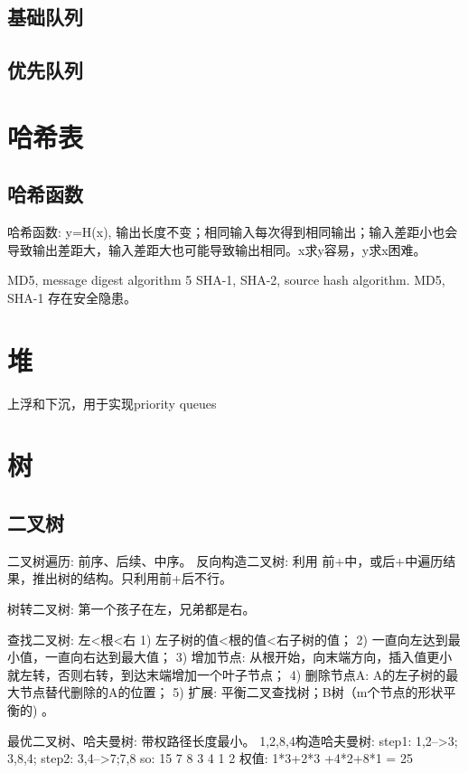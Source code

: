 \documentclass[UTF8]{../../computerUniverse}
\begin{document}
\section{基础队列}

\section{优先队列}



\chapter{哈希表}

\section{哈希函数}
哈希函数: y=H(x), 输出长度不变；相同输入每次得到相同输出；输入差距小也会导致输出差距大，输入差距大也可能导致输出相同。x求y容易，y求x困难。

MD5, message digest algorithm 5
SHA-1, SHA-2, source hash algorithm.
MD5, SHA-1 存在安全隐患。




\chapter{堆}
上浮和下沉，用于实现priority queues


\chapter{树}


\section{二叉树}

二叉树遍历: 前序、后续、中序。
反向构造二叉树: 利用 前+中，或后+中遍历结果，推出树的结构。只利用前+后不行。

树转二叉树: 第一个孩子在左，兄弟都是右。


查找二叉树: 左<根<右
1) 左子树的值<根的值<右子树的值；
2) 一直向左达到最小值，一直向右达到最大值；
3) 增加节点: 从根开始，向末端方向，插入值更小就左转，否则右转，到达末端增加一个叶子节点；
4) 删除节点A: A的左子树的最大节点替代删除的A的位置；
5) 扩展: 平衡二叉查找树；B树（m个节点的形状平衡的) 。



最优二叉树、哈夫曼树: 带权路径长度最小。 
1,2,8,4构造哈夫曼树: 
step1: 1,2-->3; 3,8,4;
step2: 3,4-->7;7,8
so:        15
      7       8
   3    4
1    2
权值:  1*3+2*3 +4*2+8*1 = 25
\end{document}
